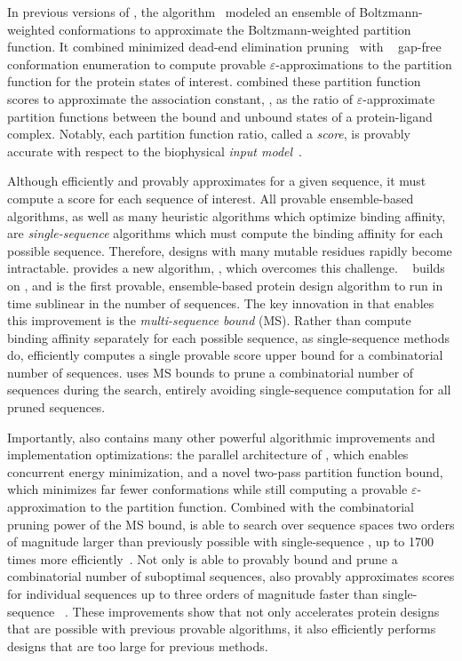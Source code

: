 \def\multisequencebound{MS\xspace}
\def\msbound{\multisequencebound}


\newcommand{\cut}[1]{}

In previous versions of \osprey, the \ks algorithm~\cite{K*} modeled an ensemble of Boltzmann-weighted conformations to approximate the Boltzmann-weighted partition function. It combined minimized dead-end elimination pruning~\cite{DEE} with \as~\cite{DEE,A*} gap-free conformation enumeration to compute provable $\varepsilon$-approximations to the partition function for the protein states of interest. \ks combined these partition function scores to approximate the association constant, \ka, as the ratio of $\varepsilon$-approximate partition functions between the bound and unbound states of a protein-ligand complex. Notably, each partition function ratio, called a \ks \emph{score}, is provably accurate with respect to the biophysical \emph{input model}~\cite{K*,minDEE,iMinDEE}. 

Although \ks efficiently and provably approximates \ka for a given sequence, it must compute a \ks score for each sequence of interest. All provable ensemble-based algorithms, as well as many heuristic algorithms which optimize binding affinity, are \emph{single-sequence} algorithms which must compute the binding affinity for each possible sequence. Therefore, designs with many mutable residues rapidly become intractable.  provides a new algorithm, \bbks, which overcomes this challenge. \bbks~\cite{BBK*} builds on \ks, and is the first provable, ensemble-based protein design algorithm to run in time sublinear in the number of sequences. The key innovation in \bbks that enables this improvement is the \emph{multi-sequence bound} (\msbound). Rather than compute binding affinity separately for each possible sequence, as single-sequence methods do, \bbks efficiently computes a single provable \ks score upper bound for a combinatorial number of sequences. \bbks uses \msbound bounds to prune a combinatorial number of sequences during the search, entirely avoiding single-sequence computation for all pruned sequences.

Importantly, \bbks also contains many other powerful algorithmic improvements and implementation optimizations: the parallel architecture of \bbks, which enables concurrent energy minimization, and a novel two-pass partition function bound, which minimizes far fewer conformations while still computing a provable $\varepsilon$-approximation to the partition function. Combined with the combinatorial pruning power of the \msbound bound, \bbks is able to search over sequence spaces two orders of magnitude larger than previously possible with single-sequence \ks, up to 1700 times more efficiently~\cite{BBK*}. Not only is \bbks able to provably bound and prune a combinatorial number of suboptimal sequences, \bbks also provably approximates \ks scores for individual sequences up to three orders of magnitude faster than single-sequence \ks~\cite{BBK*}. These improvements show that \bbks not only accelerates protein designs that are possible with previous provable algorithms, it also efficiently performs designs that are too large for previous methods.